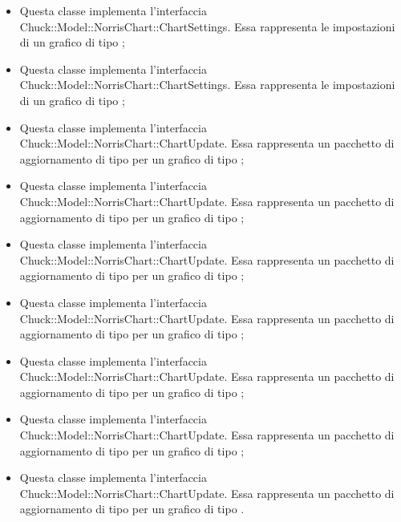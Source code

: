 \begin{itemize}
		\item {} Questa classe implementa l'interfaccia \linebreak Chuck::Model::NorrisChart::ChartSettings. Essa rappresenta le impostazioni di un grafico di tipo ;

		\item {} Questa classe implementa l'interfaccia \linebreak Chuck::Model::NorrisChart::ChartSettings. Essa rappresenta le impostazioni di un grafico di tipo ;

		\item {} Questa classe implementa l'interfaccia Chuck::Model::NorrisChart::ChartUpdate. Essa rappresenta un pacchetto di aggiornamento di tipo  per un grafico di tipo ;

		\item {} Questa classe implementa l'interfaccia Chuck::Model::NorrisChart::ChartUpdate. Essa rappresenta un pacchetto di aggiornamento di tipo  per un grafico di tipo ;

		\item {} Questa classe implementa l'interfaccia Chuck::Model::NorrisChart::ChartUpdate. Essa rappresenta un pacchetto di aggiornamento di tipo  per un grafico di tipo ;

		\item {} Questa classe implementa l'interfaccia Chuck::Model::NorrisChart::ChartUpdate. Essa rappresenta un pacchetto di aggiornamento di tipo  per un grafico di tipo ;

		\item {} Questa classe implementa l'interfaccia Chuck::Model::NorrisChart::ChartUpdate. Essa rappresenta un pacchetto di aggiornamento di tipo  per un grafico di tipo ;

		\item {} Questa classe implementa l'interfaccia Chuck::Model::NorrisChart::ChartUpdate. Essa rappresenta un pacchetto di aggiornamento di tipo  per un grafico di tipo ;

		\item {} Questa classe implementa l'interfaccia Chuck::Model::NorrisChart::ChartUpdate. Essa rappresenta un pacchetto di aggiornamento di tipo  per un grafico di tipo .
	\end{itemize}
